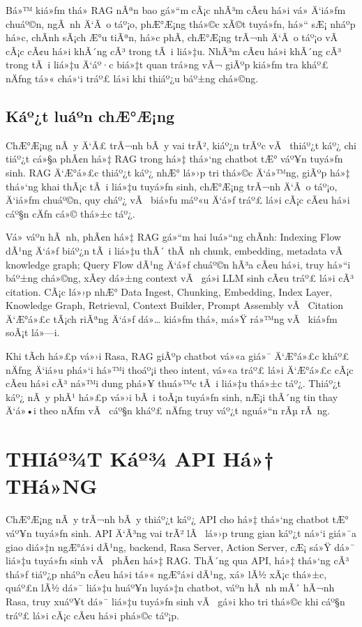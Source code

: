 ﻿\documentclass[12pt,a4paper]{report}
\begin{document}
Bá»™ kiá»ƒm thá»­ RAG nÃªn bao gá»“m cÃ¡c nhÃ³m cÃ¢u há»i vá» Ä‘iá»ƒm chuáº©n, ngÃ nh Ä‘Ã o táº¡o, phÆ°Æ¡ng thá»©c xÃ©t tuyá»ƒn, há»“ sÆ¡ nháº­p há»c, chÃ­nh sÃ¡ch Æ°u tiÃªn, há»c phÃ­, chÆ°Æ¡ng trÃ¬nh Ä‘Ã o táº¡o vÃ  cÃ¡c cÃ¢u há»i khÃ´ng cÃ³ trong tÃ i liá»‡u. NhÃ³m cÃ¢u há»i khÃ´ng cÃ³ trong tÃ i liá»‡u Ä‘áº·c biá»‡t quan trá»ng vÃ¬ giÃºp kiá»ƒm tra kháº£ nÄƒng tá»« chá»‘i tráº£ lá»i khi thiáº¿u báº±ng chá»©ng.

\section{Káº¿t luáº­n chÆ°Æ¡ng}

ChÆ°Æ¡ng nÃ y Ä‘Ã£ trÃ¬nh bÃ y vai trÃ², kiáº¿n trÃºc vÃ  thiáº¿t káº¿ chi tiáº¿t cá»§a phÃ¢n há»‡ RAG trong há»‡ thá»‘ng chatbot tÆ° váº¥n tuyá»ƒn sinh. RAG Ä‘Æ°á»£c thiáº¿t káº¿ nhÆ° lá»›p tri thá»©c Ä‘á»™ng, giÃºp há»‡ thá»‘ng khai thÃ¡c tÃ i liá»‡u tuyá»ƒn sinh, chÆ°Æ¡ng trÃ¬nh Ä‘Ã o táº¡o, Ä‘iá»ƒm chuáº©n, quy cháº¿ vÃ  biá»ƒu máº«u Ä‘á»ƒ tráº£ lá»i cÃ¡c cÃ¢u há»i cáº§n cÄƒn cá»© thá»±c táº¿.

Vá» váº­n hÃ nh, phÃ¢n há»‡ RAG gá»“m hai luá»“ng chÃ­nh: Indexing Flow dÃ¹ng Ä‘á»ƒ biáº¿n tÃ i liá»‡u thÃ´ thÃ nh chunk, embedding, metadata vÃ  knowledge graph; Query Flow dÃ¹ng Ä‘á»ƒ chuáº©n hÃ³a cÃ¢u há»i, truy há»“i báº±ng chá»©ng, xÃ¢y dá»±ng context vÃ  gá»i LLM sinh cÃ¢u tráº£ lá»i cÃ³ citation. CÃ¡c lá»›p nhÆ° Data Ingest, Chunking, Embedding, Index Layer, Knowledge Graph, Retrieval, Context Builder, Prompt Assembly vÃ  Citation Ä‘Æ°á»£c tÃ¡ch riÃªng Ä‘á»ƒ dá»… kiá»ƒm thá»­, má»Ÿ rá»™ng vÃ  kiá»ƒm soÃ¡t lá»—i.

Khi tÃ­ch há»£p vá»›i Rasa, RAG giÃºp chatbot vá»«a giá»¯ Ä‘Æ°á»£c kháº£ nÄƒng Ä‘iá»u phá»‘i há»™i thoáº¡i theo intent, vá»«a tráº£ lá»i Ä‘Æ°á»£c cÃ¡c cÃ¢u há»i cÃ³ ná»™i dung phá»¥ thuá»™c tÃ i liá»‡u thá»±c táº¿. Thiáº¿t káº¿ nÃ y phÃ¹ há»£p vá»›i bÃ i toÃ¡n tuyá»ƒn sinh, nÆ¡i thÃ´ng tin thay Ä‘á»•i theo nÄƒm vÃ  cáº§n kháº£ nÄƒng truy váº¿t nguá»“n rÃµ rÃ ng.



\chapter{THIáº¾T Káº¾ API Há»† THá»NG}

ChÆ°Æ¡ng nÃ y trÃ¬nh bÃ y thiáº¿t káº¿ API cho há»‡ thá»‘ng chatbot tÆ° váº¥n tuyá»ƒn sinh. API Ä‘Ã³ng vai trÃ² lÃ  lá»›p trung gian káº¿t ná»‘i giá»¯a giao diá»‡n ngÆ°á»i dÃ¹ng, backend, Rasa Server, Action Server, cÆ¡ sá»Ÿ dá»¯ liá»‡u tuyá»ƒn sinh vÃ  phÃ¢n há»‡ RAG. ThÃ´ng qua API, há»‡ thá»‘ng cÃ³ thá»ƒ tiáº¿p nháº­n cÃ¢u há»i tá»« ngÆ°á»i dÃ¹ng, xá»­ lÃ½ xÃ¡c thá»±c, quáº£n lÃ½ dá»¯ liá»‡u huáº¥n luyá»‡n chatbot, váº­n hÃ nh mÃ´ hÃ¬nh Rasa, truy xuáº¥t dá»¯ liá»‡u tuyá»ƒn sinh vÃ  gá»i kho tri thá»©c khi cáº§n tráº£ lá»i cÃ¡c cÃ¢u há»i phá»©c táº¡p.
\end{document}
